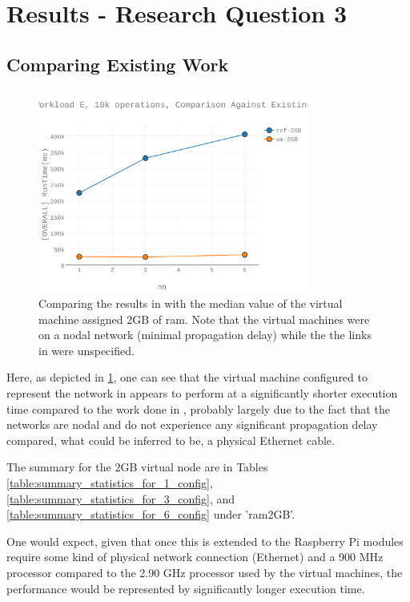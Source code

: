 \section{Results - Research Question 3}

\subsection{Comparing Existing Work}

\begin{figure}[h]
\includegraphics[width=3.5in]{Figures/figures-wle_fig5.pdf}

\caption{Comparing the results in \cite{Abramova2014} with the median value of the virtual machine assigned 2GB of \gls{ram}.  Note that the virtual machines were on a nodal network (minimal propagation delay) while the the links in \cite{Abramova2014} were unspecified.}

\label{fig:figures-wle_fig5}
\end{figure}

Here, as depicted in \ref{fig:figures-wle_fig5}, one can see that the virtual machine configured to represent the network in \cite{Abramova2014} appears to perform at a significantly shorter execution time compared to the work done in \cite{Abramova2014}, probably largely due to the fact that the networks are nodal and do not experience any significant propagation delay compared, what could be inferred to be, a physical Ethernet cable.

The summary for the 2GB virtual node are in Tables \ref{table:summary_statistics_for_1_config}, \ref{table:summary_statistics_for_3_config}, and \ref{table:summary_statistics_for_6_config} under 'ram2GB'.  

One would expect, given that once this is extended to the Raspberry Pi modules require some kind of physical network connection (Ethernet) and a 900 MHz processor compared to the 2.90 GHz processor used by the virtual machines, the performance would be represented by significantly longer execution time.  

